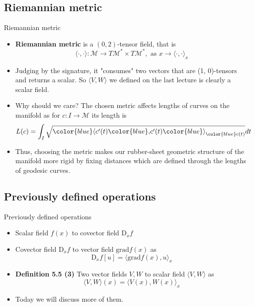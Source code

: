 \documentclass{beamer}
\begin{document}
\subsection{Riemannian metric}
\begin{frame}{Riemannian metric}
    \begin{itemize}
        \item \textbf{Riemannian metric} is a $(0, 2)$-tensor field, that is 
        \begin{equation}
            \langle \cdot, \cdot \rangle : \mathcal{M} \to T\mathcal{M}^* \times T\mathcal{M}^*, \text{ as } x \to \langle \cdot, \cdot \rangle_x 
        \end{equation}
        \item Judging by the signature, it "consumes" two vectors that are (1, 0)-tensors and returns a scalar. So $\langle V, W\rangle$ we defined on the last lecture is clearly a scalar field. 
        \item Why should we care? The chosen metric affects lengths of curves on the manifold as for $c : I \to \mathcal{M}$ its length is 
        \begin{equation}
            L(c) = \int_{I}{\sqrt{{\color{blue}\langle} c^\prime (t){\color{blue},} c^\prime(t){\color{blue}\rangle}_{{\color{blue}c(t)}}} dt}
        \end{equation}
        \item Thus, choosing the metric makes our rubber-sheet geometric structure of the manifold more rigid by fixing distances which are defined through the lengths of geodesic curves. 
    \end{itemize}
\end{frame}

\subsection{Previously defined operations}
\begin{frame}{Previously defined operations}
    \begin{itemize}
        \item Scalar field $f(x)$ to covector field $\text{D}_x f$
        \item Covector field $\text{D}_x f$ to vector field $\text{grad} f(x)$ as 
        \begin{equation}
              \text{D}_x f[u] = \langle \text{grad} f(x), u  \rangle_x
        \end{equation}
        \item \textbf{Definition 5.5 (3)} Two vector fields $V, W$ to scalar field $\langle V, W\rangle$ as 
        \begin{equation}
            \langle V, W\rangle(x) = \langle V(x), W(x)\rangle_x 
        \end{equation}
        \item Today we will discuss more of them. 
    \end{itemize}
\end{frame}
\end{document}

